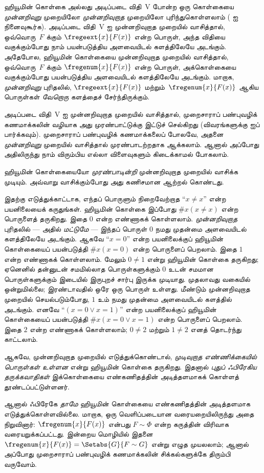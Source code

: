 \documentclass[../../../include/open-logic-section]{subfiles}
\begin{document}
ஹியூமின் கொள்கை அல்லது அடிப்படை விதி~V போன்ற ஒரு கொள்கையை
\emph{முன்னறிவுறு} முறையிலோ \emph{முன்னறிவுறாத} முறையிலோ
புரிந்துகொள்ளலாம் ( ஐ நினைவுகூர்க).
அடிப்படை விதி~V ஐ முன்னறிவுறாத முறையில் வாசித்தால், ஒவ்வொரு~$F$
க்கும் $\fregeext{x}{F(x)}$ என்ற பொருள், அந்த விதியை வகுக்கும்போது
நாம் பயன்படுத்திய அளவையிடல் களத்திலேயே அடங்கும்.
அதேபோல, ஹியூமின் கொள்கையை முன்னறிவுறாத முறையில் வாசித்தால்,
ஒவ்வொரு~$F$ க்கும் $\fregenum{x}{F(x)}$ என்ற பொருள்,
அக்கொள்கையை வகுக்கும்போது பயன்படுத்திய அளவையிடல் களத்திலேயே
அடங்கும். மாறாக, \emph{முன்னறிவுறு} புரிதலில்,
$\fregeext{x}{F(x)}$ மற்றும்~$\fregenum{x}{F(x)}$ ஆகிய
பொருள்கள் \emph{வேறொரு} களத்தைச் சேர்ந்திருக்கும்.

அடிப்படை விதி~V ஐ முன்னறிவுறாத முறையில் வாசித்தால்,
முறைசாராப் பண்புவழிக் கணமாக்கலின் வழியாக அது முரண்பாட்டுக்கு
இட்டுச் செல்கிறது (விவரங்களுக்கு  ஐப்
பார்க்கவும்). முறைசாராப் பண்புவழிக் கணமாக்கலைப் போலவே,
அதனை \emph{முன்னறிவுறு} முறையில் வாசித்தால் முரண்பாடற்றதாக
ஆக்கலாம். ஆனால் அப்போது அதிலிருந்து நாம் விரும்பிய எல்லா
விளைவுகளும் கிடைக்காமல் போகலாம்.

ஹியூமின் கொள்கையையோ \emph{முரண்பாடின்றி} முன்னறிவுறாத முறையில்
வாசிக்க முடியும். அவ்வாறு வாசிக்கும்போது அது கணிசமான ஆற்றல்
கொண்டது.

இதற்கு எடுத்துக்காட்டாக, எந்தப் பொருளும் நிறைவேற்றாத ``$x \neq x$''
என்ற பயனிலையைக் கருதுங்கள். ஹியூமின் கொள்கை இப்போது
$\# x( x\neq x)$ என்ற பொருளைத் தருகிறது. இதை $0$ என்ற எண்ணாகக்
கொள்ளலாம். \emph{முன்னறிவுறாத} புரிதலில் --- அதில்
\emph{மட்டுமே} --- இந்தப் பொருள் $0$ நமது முதன்மை அளவையிடல்
களத்திலேயே அடங்கும். ஆகவே ``$x = 0$'' என்ற பயனிலைக்குப்
ஹியூமின் கொள்கையைப் பயன்படுத்தி $\#x (x = 0)$ என்ற பொருளைப்
பெறலாம். இதை $1$ என்ற எண்ணாகக் கொள்ளலாம். மேலும் $0 \neq 1$
என்று ஹியூமின் கொள்கை தருகிறது; ஏனெனில் தன்னுடன் சமமில்லாத
பொருள்களுக்கும் $0$ உடன் சமமான பொருள்களுக்கும் இடையில் இருபுறச்
சார்பு இருக்க முடியாது. முதலாவது வகையில் ஒன்றுமில்லை; இரண்டாவதில்
ஒரே ஒரு பொருள் உள்ளது. மீண்டும் முன்னறிவுறாத முறையில்
செயல்படும்போது, $1$ உம் நமது முதன்மை அளவையிடல் களத்தில்
அடங்கும். எனவே ``$(x = 0 \lor x = 1)$'' என்ற பயனிலைக்குப்
ஹியூமின் கொள்கையைப் பயன்படுத்தி $\#x(x = 0 \lor x = 1)$
என்ற பொருளைப் பெறலாம். இதை $2$ என்ற எண்ணாகக் கொள்ளலாம்;
$0\neq 2$ மற்றும் $1 \neq 2$ எனத் தொடர்ந்து காட்டலாம்.

ஆகவே, முன்னறிவுறாத முறையில் எடுத்துக்கொண்டால்,
\emph{முடிவுறாத எண்ணிக்கையில் பொருள்கள் உள்ளன} என்று
ஹியூமின் கொள்கை தருகிறது. இதனால் \emph{புதுப் ஃபிரேகிய
தருக்கவாதிகள்} இக்கொள்கையை எண்கணிதத்தின் அடித்தளமாகக்
கொள்ளத் தூண்டப்பட்டுள்ளனர்.

ஆனால் ஃபிரேகே \emph{தாமே} ஹியூமின் கொள்கையை எண்கணிதத்தின்
அடித்தளமாக எடுத்துக்கொள்ளவில்லை. மாறாக, ஒரு வெளிப்படையான
வரையறையிலிருந்து அதை நிறுவினார்: $\fregenum{x}{F(x)}$ என்பது
$F \sim \Phi$ என்ற கருத்தின் விரிவாக வரையறுக்கப்பட்டது.
இன்றைய மொழியில் இதனை $\fregenum{x}{F(x)} = \Setabs{G}{F \sim G}$
என்று எழுத முயலலாம்; ஆனால் அப்போது முறைசாராப் பண்புவழிக்
கணமாக்கலின் சிக்கல்களுக்கே திரும்பி வருவோம்.
\end{document}
